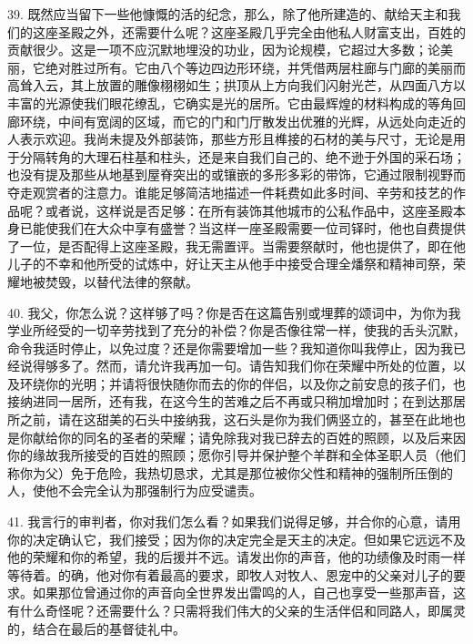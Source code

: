 39. 既然应当留下一些他慷慨的活的纪念，那么，除了他所建造的、献给天主和我们的这座圣殿之外，还需要什么呢？这座圣殿几乎完全由他私人财富支出，百姓的贡献很少。这是一项不应沉默地埋没的功业，因为论规模，它超过大多数；论美丽，它绝对胜过所有。它由八个等边四边形环绕，并凭借两层柱廊与门廊的美丽而高耸入云，其上放置的雕像栩栩如生；拱顶从上方向我们闪射光芒，从四面八方以丰富的光源使我们眼花缭乱，它确实是光的居所。它由最辉煌的材料构成的等角回廊环绕，中间有宽阔的区域，而它的门和门厅散发出优雅的光辉，从远处向走近的人表示欢迎。我尚未提及外部装饰，那些方形且榫接的石材的美与尺寸，无论是用于分隔转角的大理石柱基和柱头，还是来自我们自己的、绝不逊于外国的采石场；也没有提及那些从地基到屋脊突出的或镶嵌的多形多彩的带饰，它通过限制视野而夺走观赏者的注意力。谁能足够简洁地描述一件耗费如此多时间、辛劳和技艺的作品呢？或者说，这样说是否足够：在所有装饰其他城市的公私作品中，这座圣殿本身已能使我们在大众中享有盛誉？当这样一座圣殿需要一位司铎时，他也自费提供了一位，是否配得上这座圣殿，我无需置评。当需要祭献时，他也提供了，即在他儿子的不幸和他所受的试炼中，好让天主从他手中接受合理全燔祭和精神司祭，荣耀地被焚毁，以替代法律的祭献。\par

40. 我父，你怎么说？这样够了吗？你是否在这篇告别或埋葬的颂词中，为你为我学业所经受的一切辛劳找到了充分的补偿？你是否像往常一样，使我的舌头沉默，命令我适时停止，以免过度？还是你需要增加一些？我知道你叫我停止，因为我已经说得够多了。然而，请允许我再加一句。请告知我们你在荣耀中所处的位置，以及环绕你的光明；并请将很快随你而去的你的伴侣，以及你之前安息的孩子们，也接纳进同一居所，还有我，在这今生的苦难之后不再或只稍加增加时；在到达那居所之前，请在这甜美的石头中接纳我，这石头是你为我们俩竖立的，甚至在此地也是你献给你的同名的圣者的荣耀；请免除我对我已辞去的百姓的照顾，以及后来因你的缘故我所接受的百姓的照顾；愿你引导并保护整个羊群和全体圣职人员（他们称你为父）免于危险，我热切恳求，尤其是那位被你父性和精神的强制所压倒的人，使他不会完全认为那强制行为应受谴责。\par

41. 我言行的审判者，你对我们怎么看？如果我们说得足够，并合你的心意，请用你的决定确认它，我们接受；因为你的决定完全是天主的决定。但如果它远远不及他的荣耀和你的希望，我的后援并不远。请发出你的声音，他的功绩像及时雨一样等待着。的确，他对你有着最高的要求，即牧人对牧人、恩宠中的父亲对儿子的要求。如果那位曾通过你的声音向全世界发出雷鸣的人，自己也享受一些那声音，这有什么奇怪呢？还需要什么？只需将我们伟大的父亲的生活伴侣和同路人，即属灵的，结合在最后的基督徒礼中。\par

